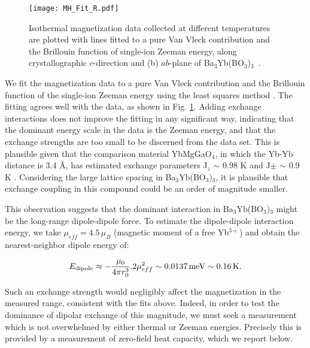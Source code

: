 \documentclass[aps,prl,reprint,showpacs,showkeys,superscriptaddress,floatfix,twocolumn]{revtex4-2}
\newcommand{\bybo}{Ba$_3$Yb(BO$_3$)$_3$}
\begin{document}
\begin{figure}[htbp]\centering\texttt{[image: MH\_Fit\_R.pdf]}
	\caption{Isothermal magnetization data collected at different temperatures are plotted with lines fitted to a pure Van Vleck contribution and the Brillouin function of single-ion Zeeman energy, along crystallographic $c$-direction and (b) $ab$-plane of \bybo~.}
	\label{MH1}
\end{figure} 

We fit the magnetization data to a pure Van Vleck contribution and the  Brillouin function of the single-ion Zeeman energy using the least squares method \cite{LiPRL2015}. The fitting agrees well with the data, as shown in Fig. \ref{MH1}. Adding exchange interactions does not improve the fitting in any significant way, indicating that the dominant energy scale in the data is the Zeeman energy, and that the exchange strengths are too small to be discerned from the data set. This is plausible given that the comparison material YbMgGaO$_4$, in which the Yb-Yb distance is 3.4 \AA, has estimated exchange parameters J$_z$ $\sim$ 0.98 K and J$\pm$ $\sim$ 0.9 K \cite{LiPRL2015}. Considering the large lattice spacing in \bybo{}, it is plausible that exchange coupling in this compound could be an order of magnitude smaller.

This observation suggests that the dominant interaction in \bybo{} might be the long-range dipole-dipole force. To estimate the dipole-dipole interaction energy, we take $\mu_{eff}=4.5\,\mu_B$ (magnetic moment of a free Yb$^{3+}$) and obtain the nearest-neighbor dipole energy of:

\begin{equation}
\label{dipole}
E_{\rm dipole} \approx - \frac{\mu_0}{4\pi r_0^3}. 2\mu_{eff}^2  \sim 0.0137\,\text{meV} \sim 0.16\,\text{K}.
\end{equation}

Such an exchange strength would negligibly affect the magnetization in the measured range, consistent with the fits above.  Indeed, in order to test the dominance of dipolar exchange of this magnitude, we must seek a measurement which is not overwhelmed by either thermal or Zeeman energies.  Precisely this is provided by a measurement of zero-field heat capacity, which we report below.
\end{document}
